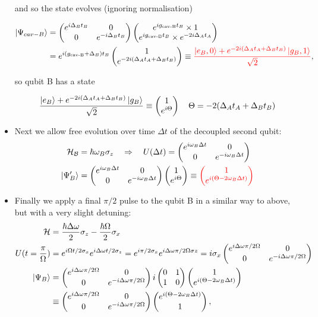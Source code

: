 \begin{itemize}
		\noindent and so the state evolves (ignoring normalisation)
		
		\[
		\begin{aligned}
		\Ket{\Psi_{cav-B}} &=
		\begin{pmatrix}
		e^{i\Delta_B t_B} & 0\\0&e^{-i\Delta_B t_B}
		\end{pmatrix}\begin{pmatrix}
		e^{ig_\text{cav-B}t_B} \times 1 \\e^{ig_\text{cav-B}t_B} \times e^{-2i\Delta_At_A}
		\end{pmatrix}\\
		& = e^{i(g_\text{cav-B}+\Delta_B)t_B} \begin{pmatrix}
		1 \\e^{-2i(\Delta_A t_A+\Delta_B t_B)}\\
		\end{pmatrix} \equiv {\color{red}{\frac{\ensuremath{\Ket{e_B,0}}+e^{-2i(\Delta_A t_A+\Delta_B t_B)}\ensuremath{\Ket{g_B,1}}}{\sqrt{2}}}},
		\end{aligned}
		\]
		
		\noindent so qubit B has a state
		
		\[
		\frac{\Ket{e_B}+e^{-2i(\Delta_A t_A+\Delta_B t_B)}\Ket{g_B}}{\sqrt{2}} \equiv \begin{pmatrix}
			1 \\ e^{i\Theta}
		\end{pmatrix}\quad \Theta = -2(\Delta_A t_A+\Delta_B t_B)
		\]
		
		
		\item Next we allow free evolution over time $ \Delta t $ of the decoupled second qubit:
		\[
			\begin{aligned}
			\mathcal{H_B} &= \hbar\omega_B\sigma_z \quad\Rightarrow\quad U(\Delta t) = \begin{pmatrix}e^{i\omega_B \Delta t}&0\\0&e^{-i\omega_B \Delta t}\end{pmatrix}\\
			\Ket{\Psi_B'} & = \begin{pmatrix}e^{i\omega_B \Delta t}&0\\0&e^{-i\omega_B \Delta t}\end{pmatrix}\begin{pmatrix} 1\\e^{i\Theta} \end{pmatrix} \equiv {\color{red}{\ensuremath{\begin{pmatrix} 1\\e^{i(\Theta - 2\omega_B \Delta t)} \end{pmatrix}}}}
			\end{aligned}
		\]
		
		\item Finally we apply a final $ \pi/2 $ pulse to the qubit B in a similar way to above, but with a very slight detuning:
		\[
			\begin{aligned}
						 \mathcal{H} & = \frac{\hbar\Delta\omega}{2}\sigma_z -\frac{\hbar\Omega}{2}\sigma_x\\
						U(t=\frac{\pi}{\Omega}) &= e^{i\Omega t/2\sigma_x} e^{i\Delta\omega t/2\sigma_z}= e^{i\pi/2\sigma_x} e^{i\Delta\omega \pi/2\Omega\sigma z}= i\sigma_x\begin{pmatrix}e^{i\Delta\omega \pi/2\Omega}&0\\0&e^{-i\Delta\omega \pi/2\Omega}\end{pmatrix}\\
						\Ket{\Psi_B} & =\begin{pmatrix}e^{i\Delta\omega \pi/2\Omega}&0\\0&e^{-i\Delta\omega \pi/2\Omega}\end{pmatrix} i\begin{pmatrix}0&1\\1&0\end{pmatrix}\begin{pmatrix} 1\\e^{i(\Theta - 2\omega_B \Delta t)} \end{pmatrix}\\
						&\equiv \begin{pmatrix}e^{i\Delta\omega \pi/2\Omega}&0\\0&e^{-i\Delta\omega \pi/2\Omega}\end{pmatrix} \begin{pmatrix} e^{i(\Theta - 2\omega_B \Delta t)}\\1 \end{pmatrix},
			\end{aligned}
		\]
		

\end{itemize}
